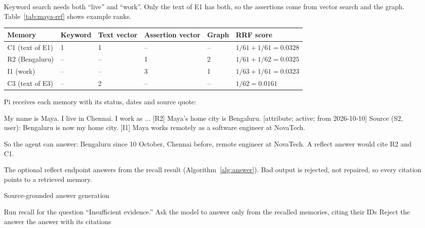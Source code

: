 \begin{maya}
Keyword search needs both ``live'' and ``work''. Only the text of E1 has both, so the
assertions come from vector search and the graph. Table~\ref{tab:maya-rrf} shows example ranks.
\begin{center}
\begin{minipage}{\linewidth}
\centering
{}
\label{tab:maya-rrf}
\begin{reporttable}
\begin{tabularx}{\linewidth}{|L{2.4cm}|Y|Y|Y|Y|L{3.4cm}|}
\hline
\textbf{Memory} & \textbf{Keyword} & \textbf{Text vector} & \textbf{Assertion vector} & \textbf{Graph} & \textbf{RRF score} \\
\hline
C1 (text of E1) & 1 & 1 & -- & -- & $1/61 + 1/61 = 0.0328$ \\
\hline
R2 (Bengaluru) & -- & -- & 1 & 2 & $1/61 + 1/62 = 0.0325$ \\
\hline
I1 (work) & -- & -- & 3 & 1 & $1/63 + 1/61 = 0.0323$ \\
\hline
C3 (text of E3) & -- & 2 & -- & -- & $1/62 = 0.0161$ \\
\hline
\end{tabularx}
\end{reporttable}
\end{minipage}
\end{center}
Pi receives each memory with its status, dates and source quote:
\begin{datablock}
[C1] My name is Maya. I live in Chennai. I work as ...
[R2] Maya's home city is Bengaluru. [attribute; active; from 2026-10-10]
  Source (S2, user): Bengaluru is now my home city.
[I1] Maya works remotely as a software engineer at NovaTech.
\end{datablock}
So the agent can answer: Bengaluru since 10 October, Chennai before, remote engineer at
NovaTech. A reflect answer would cite R2 and C1.
\end{maya}

The optional reflect endpoint answers from the recall result (Algorithm~\ref{alg:answer}). Bad
output is rejected, not repaired, so every citation points to a retrieved memory.

\begin{algorithm}[!htbp]
\caption{Source-grounded answer generation}
\label{alg:answer}
\begin{algorithmic}[1]
\State Run recall for the question
  \State \Return ``Insufficient evidence.''
\EndIf
\State Ask the model to answer only from the recalled memories, citing their IDs
  \State Reject the answer
\EndIf
\State \Return the answer with its citations
\end{algorithmic}
\end{algorithm}

